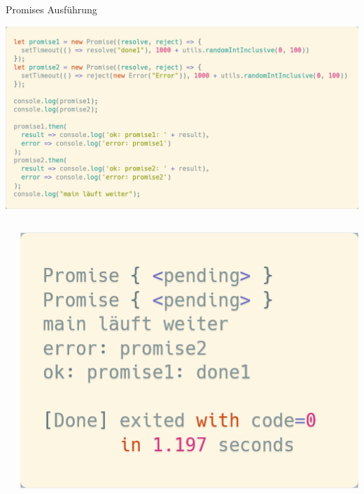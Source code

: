 \documentclass[t,handout]{beamer}
\begin{document}
\begin{frame}{Promises Ausführung}
  \begin{center}
    \includegraphics[scale=.22]{fig/promises2a.png}\\[-2.9cm]
    \begin{columns}
      \begin{column}{0.5\textwidth}
        \mbox{}
      \end{column}
      \begin{column}{0.3\textwidth}
        \includegraphics[scale=.21]{fig/promises2b.png}
      \end{column}
    \end{columns}
  \end{center}
\end{frame}
\end{document}
